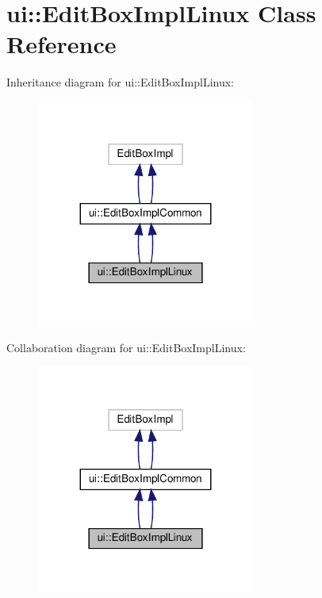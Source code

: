 \hypertarget{classui_1_1EditBoxImplLinux}{}\section{ui\+:\+:Edit\+Box\+Impl\+Linux Class Reference}
\label{classui_1_1EditBoxImplLinux}


Inheritance diagram for ui\+:\+:Edit\+Box\+Impl\+Linux\+:
\nopagebreak
\begin{figure}[H]
\begin{center}
\leavevmode
\includegraphics[width=203pt]{classui_1_1EditBoxImplLinux__inherit__graph}
\end{center}
\end{figure}


Collaboration diagram for ui\+:\+:Edit\+Box\+Impl\+Linux\+:
\nopagebreak
\begin{figure}[H]
\begin{center}
\leavevmode
\includegraphics[width=203pt]{classui_1_1EditBoxImplLinux__coll__graph}
\end{center}
\end{figure}
